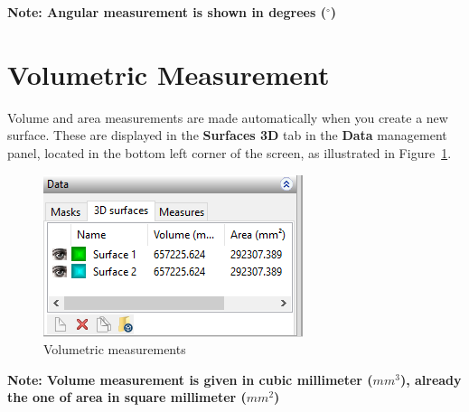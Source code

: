\textbf{Note: Angular measurement is shown in degrees ($^{\circ}$)}


\section{Volumetric Measurement}

Volume and area measurements are made automatically when you create a new surface. These are displayed in the \textbf{Surfaces 3D} tab in the \textbf{Data} management panel, located in the bottom left corner of the screen, as illustrated in Figure~\ref{fig:volumetric_mensure}.

\begin{figure}[!htb]
\centering
\includegraphics[scale=0.7]{../user_guide_figures/invesalius_screen/painel_volumetric_measures_en.png}
\caption{Volumetric measurements}
\label{fig:volumetric_mensure}
\end{figure}

\textbf{Note: Volume measurement is given in cubic millimeter ($mm^3$), already the one of area in square millimeter ($mm^2$)}